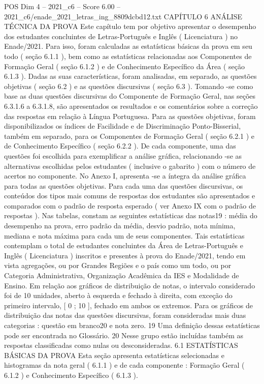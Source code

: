\begin{textsample}{POS Dim 4 – 2021\_c6 – Score 6.00 – 2021\_c6/enade\_2021\_letras\_ing\_8809dcbd12.txt}  \label{ex:f4_pos_065}
CAPÍTULO 6 ANÁLISE TÉCNICA DA PROVA Este capítulo tem por objetivo apresentar o desempenho dos estudantes concluintes de Letras-Português e Inglês ( Licenciatura ) no Enade/2021.
Para isso, foram calculadas as estatísticas básicas da prova em seu todo ( seção 6.1.1 ), bem como as estatísticas relacionadas aos Componentes de Formação Geral ( seção 6.1.2 ) e de Conhecimento Específico da Área ( seção 6.1.3 ).
Dadas as suas características, foram analisadas, em separado, as questões objetivas ( seção 6.2 ) e as questões discursivas ( seção 6.3 ).
Tomando -se como base as duas questões discursivas do Componente de Formação Geral, nas seções 6.3.1.6 a 6.3.1.8, são apresentados os resultados e os comentários sobre a correção das respostas em relação à Língua Portuguesa.
Para as questões objetivas, foram disponibilizados os índices de Facilidade e de Discriminação Ponto-Bisserial, também em separado, para os Componentes de Formação Geral ( seção 6.2.1 ) e de Conhecimento Específico ( seção 6.2.2 ).
De cada componente, uma das questões foi escolhida para exemplificar a análise gráfica, relacionando -se as alternativas escolhidas pelos estudantes ( inclusive o gabarito ) com o número de acertos no componente.
No Anexo I, apresenta -se a íntegra da análise gráfica para todas as questões objetivas.
Para cada uma das questões discursivas, os conteúdos dos tipos mais comuns de respostas dos estudantes são apresentados e comparados com o padrão de resposta esperado ( ver Anexo IX com o padrão de respostas ).
Nas tabelas, constam as seguintes estatísticas das notas19 : média do desempenho na prova, erro padrão da média, desvio padrão, nota mínima, mediana e nota máxima para cada um de seus componentes.
Tais estatísticas contemplam o total de estudantes concluintes da Área de Letras-Português e Inglês ( Licenciatura ) inscritos e presentes à prova do Enade/2021, tendo em vista agregações, ou por Grandes Regiões e o país como um todo, ou por Categoria Administrativa, Organização Acadêmica da IES e Modalidade de Ensino.
Em relação aos gráficos de distribuição de notas, o intervalo considerado foi de 10 unidades, aberto à esquerda e fechado à direita, com exceção do primeiro intervalo, [ 0 ; 10 ], fechado em ambos os extremos.
Para os gráficos de distribuição das notas das questões discursivas, foram consideradas mais duas categorias : questão em branco20 e nota zero. 19 Uma definição dessas estatísticas pode ser encontrada no Glossário. 20 Nesse grupo estão incluídas também as respostas classificadas como nulas ou desconsideradas. 6.1 ESTATÍSTICAS BÁSICAS DA PROVA Esta seção apresenta estatísticas selecionadas e histogramas da nota geral ( 6.1.1 ) e de cada componente : Formação Geral ( 6.1.2 ) e Conhecimento Específico ( 6.1.3 ).

\end{textsample}
